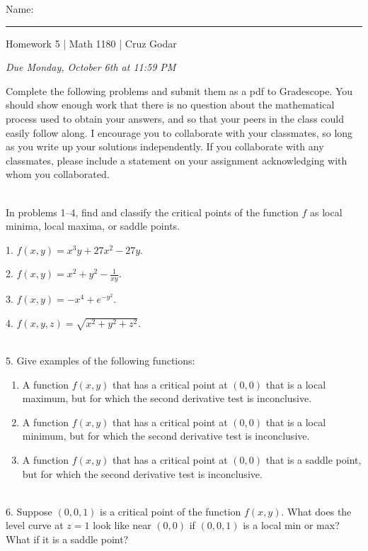 \documentclass{article}
\begin{document}
\Large Name: \rule{2in}{0.15mm} \hfill Homework 5 | Math 1180 | Cruz Godar \vspace{4pt}  \normalsize

\textit{Due Monday, October 6th at 11:59 PM}

Complete the following problems and submit them as a pdf to Gradescope. You should show enough work that there is no question about the mathematical process used to obtain your answers, and so that your peers in the class could easily follow along. I encourage you to collaborate with your classmates, so long as you write up your solutions independently. If you collaborate with any classmates, please include a statement on your assignment acknowledging with whom you collaborated.

~\\

In problems 1--4, find and classify the critical points of the function $f$ as local minima, local maxima, or saddle points.

1. $f(x, y) = x^3y + 27x^2 - 27y$.

2. $f(x, y) = x^2 + y^2 - \frac{1}{xy}$.

3. $f(x, y) = -x^4 + e^{-y^{2}}$.

4. $f(x, y, z) = \sqrt{x^2 + y^2 + z^2}$.

~\\

5. Give examples of the following functions:

\begin{enumerate}

	\item A function $f(x, y)$ that has a critical point at $(0, 0)$ that is a local maximum, but for which the second derivative test is inconclusive.

	\item A function $f(x, y)$ that has a critical point at $(0, 0)$ that is a local minimum, but for which the second derivative test is inconclusive.

	\item A function $f(x, y)$ that has a critical point at $(0, 0)$ that is a saddle point, but for which the second derivative test is inconclusive.

\end{enumerate}

~\\

6. Suppose $(0, 0, 1)$ is a critical point of the function $f(x, y)$. What does the level curve at $z = 1$ look like near $(0, 0)$ if $(0, 0, 1)$ is a local min or max? What if it is a saddle point?
\end{document}
